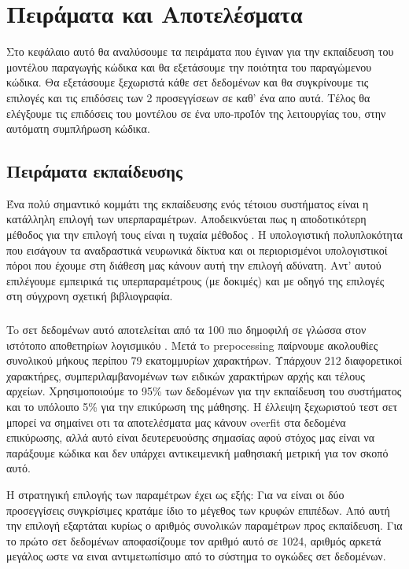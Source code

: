 \chapter{Πειράματα και Αποτελέσματα}

Στο κεφάλαιο αυτό θα αναλύσουμε τα πειράματα που έγιναν για την εκπαίδευση του μοντέλου παραγωγής κώδικα και θα εξετάσουμε την ποιότητα του παραγώμενου κώδικα. Θα εξετάσουμε ξεχωριστά κάθε σετ δεδομένων και θα συγκρίνουμε τις επιλογές και τις επιδόσεις των 2 προσεγγίσεων σε καθ' ένα απο αυτά. Τέλος θα ελέγξουμε τις επιδόσεις του μοντέλου σε ένα υπο-προΪόν της λειτουργίας του, στην αυτόματη συμπλήρωση κώδικα.


\section{Πειράματα εκπαίδευσης}

Ένα πολύ σημαντικό κομμάτι της εκπαίδευσης ενός τέτοιου συστήματος είναι η κατάλληλη επιλογή των υπερπαραμέτρων. Αποδεικνύεται πως η αποδοτικότερη μέθοδος για την επιλογή τους είναι η τυχαία μέθοδος \cite{Bersgstra2012}. Η υπολογιστική πολυπλοκότητα που εισάγουν τα αναδραστικά νευρωνικά δίκτυα και οι περιορισμένοι υπολογιστικοί πόροι που έχουμε στη διάθεση μας κάνουν αυτή την επιλογή αδύνατη. Αντ' αυτού επιλέγουμε εμπειρικά τις υπερπαραμέτρους (με δοκιμές) και με οδηγό της επιλογές στη σύγχρονη σχετική βιβλιογραφία.

\subsection{}

To σετ δεδομένων αυτό αποτελείται από τα 100 πιο δημοφιλή  σε γλώσσα  στον ιστότοπο αποθετηρίων λογισμικόυ . Μετά τo prepocessing παίρνουμε ακολουθίες συνολικού μήκους περίπου 79 εκατομμυρίων χαρακτήρων. Υπάρχουν 212 διαφορετικοί χαρακτήρες, συμπεριλαμβανομένων των ειδικών χαρακτήρων αρχής και τέλους αρχείων. Χρησιμοποιούμε το 95\% των δεδομένων για την εκπαίδευση του συστήματος και το υπόλοιπο 5\% για την επικύρωση της μάθησης. Η έλλειψη ξεχωριστού τεστ σετ μπορεί να σημαίνει οτι τα αποτελέσματα μας κάνουν overfit στα δεδομένα επικύρωσης, αλλά αυτό είναι δευτερευούσης σημασίας αφού στόχος μας είναι να παράξουμε κώδικα και δεν υπάρχει αντικειμενική μαθησιακή μετρική για τον σκοπό αυτό.

Η στρατηγική επιλογής των παραμέτρων έχει ως εξής: Για να είναι οι δύο προσεγγίσεις συγκρίσιμες κρατάμε ίδιο το μέγεθος των κρυφών επιπέδων. Από αυτή την επιλογή εξαρτάται κυρίως ο αριθμός συνολικών παραμέτρων προς εκπαίδευση. Για το πρώτο σετ δεδομένων αποφασίζουμε τον αριθμό αυτό σε 1024, αριθμός αρκετά μεγάλος ωστε να ειναι αντιμετωπίσιμο από το σύστημα το ογκώδες σετ δεδομένων.

